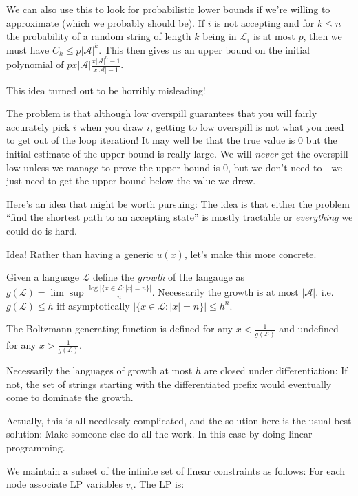 We can also use this to look for probabilistic lower bounds if we're willing to approximate (which we probably should be).
If \(i\) is not accepting and for \(k \leq n\) the probability of a random string of length \(k\) being in \(\mathcal{L}_i\) is at most \(p\),
then we must have \(C_k \leq p |\mathcal{A}|^k\).
This then gives us an upper bound on the initial polynomial of \(p x |\mathcal{A}| \frac{{x |\mathcal{A}|}^n - 1}{x |\mathcal{A}| - 1}\).

This idea turned out to be horribly misleading!

The problem is that although low overspill guarantees that you will fairly accurately pick \(i\) when you draw \(i\),
getting to low overspill is not what you need to get out of the loop iteration!
It may well be that the true value is \(0\) but the initial estimate of the upper bound is really large.
We will \emph{never} get the overspill low unless we manage to prove the upper bound is \(0\),
but we don't need to---we just need to get the upper bound below the value we drew.

Here's an idea that might be worth pursuing:
The idea is that either the problem ``find the shortest path to an accepting state'' is mostly tractable or \emph{everything} we could do is hard.

Idea! Rather than having a generic \(u(x)\),
let's make this more concrete.

Given a language \(\mathcal{L}\) define the \emph{growth} of the langauge as \(g(\mathcal{L}) = \lim\sup \frac{\log |\{x \in \mathcal{L}: |x| = n\}|}{n}\).
Necessarily the growth is at most \(|\mathcal{A}|\).
i.e. \(g(\mathcal{L}) \leq h\) iff asymptotically \(|\{x \in \mathcal{L}: |x| = n\}| \leq h^n\).

The Boltzmann generating function is defined for any \(x < \frac{1}{g(\mathcal{L})}\) and undefined for any \(x > \frac{1}{g(\mathcal{L})}\).

Necessarily the languages of growth at most \(h\) are closed under differentiation:
If not, the set of strings starting with the differentiated prefix would eventually come to dominate the growth.

Actually, this is all needlessly complicated,
and the solution here is the usual best solution:
Make someone else do all the work.
In this case by doing linear programming.

We maintain a subset of the infinite set of linear constraints as follows:
For each node associate LP variables \(v_i\).
The LP is:


